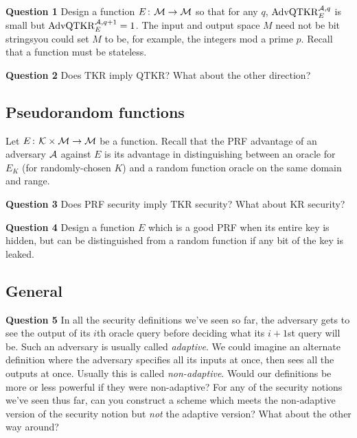 \documentclass{article}
\newcommand{\KR}{\mathrm{KR}}
\newcommand{\TKR}{\mathrm{TKR}}
\newcommand{\LQKR}{\mathrm{QTKR}}
\newcommand{\AdvLQKR}[2]{\mathrm{AdvQTKR}_{#1}^{#2}}
\newcommand{\keyspace}{\calK}
\begin{document}
\noindent\textbf{Question 1} Design a function 
$E{\kern .05em}\colon{\kern .05em} \mathcal{M}\rightarrow \mathcal{M}$ so that for any $q$, $\AdvLQKR{E}{\advA,q}$ is small but $\AdvLQKR{E}{\advA,q+1}=1$. The input and output space $M$ need not be bit strings\textemdash you could set $M$ to be, for example, the integers mod a prime $p$. Recall that a function must be stateless.

\noindent\textbf{Question 2} Does $\TKR$ imply $\LQKR$? What about the other direction?

\subsection*{Pseudorandom functions}

Let $E\Colon\keyspace\times\msgspace\rightarrow\msgspace$ be a function. Recall that the PRF advantage of an adversary ${\mathcal A}$ against $E$ is its advantage in distinguishing between an oracle for $E_K$ (for randomly-chosen $K$) and a random function oracle on the same domain and range.

\noindent\textbf{Question 3} Does PRF security imply $\TKR$ security? What about $\KR$ security?


\noindent\textbf{Question 4} Design a function $E$ which is a good PRF when its entire key is hidden, but can be distinguished from a random function if any bit of the key is leaked.

\subsection*{General}

\noindent\textbf{Question 5} In all the security definitions we've seen so far, the adversary
gets to see the output of its $i$th oracle query before deciding what its $i+1$st query will be.
Such an adversary is usually called \emph{adaptive}. We could imagine an alternate definition where
the adversary specifies all its inputs at once, then sees all the outputs at once. Usually this is
called \emph{non-adaptive}. Would our definitions be more or less powerful if they were non-adaptive?
For any of the security notions we've seen thus far, can you construct a scheme which
meets the non-adaptive version of the security notion but \emph{not} the adaptive version?
What about the other way around?
\end{document}
